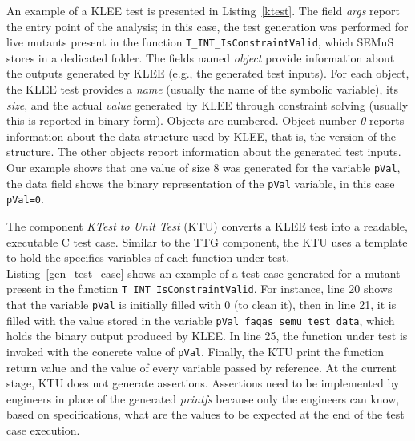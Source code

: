 An example of a KLEE test is presented in Listing~\ref{ktest}. The field \emph{args} report the entry point of the analysis; in this case, the test generation was performed for live mutants present in the function \texttt{T\_INT\_IsConstraintValid}, which SEMuS stores in a dedicated folder. The fields named \emph{object} provide information about the outputs generated by KLEE (e.g., the generated test inputs). 
For each object, the KLEE test provides a \emph{name} (usually the name of the symbolic variable), its \emph{size}, and the actual \emph{value} generated by KLEE through constraint solving (usually this is reported in binary form).
Objects are numbered. Object number \emph{0} reports information about the data structure used by KLEE, that is, the version of the structure. The other objects report information about the generated test inputs.
Our example shows that one value of size 8 was generated for the variable \texttt{pVal}, the data field shows the binary representation of the \texttt{pVal} variable, in this case \texttt{pVal=0}.





The component \emph{KTest to Unit Test} (KTU)  converts a KLEE test into a readable, executable C test case. Similar to the TTG component, the KTU uses a template to hold the specifics variables of each function under test. 
Listing~\ref{gen_test_case} shows an example of a test case generated for a mutant present in the function \texttt{T\_INT\_IsConstraintValid}. For instance, line 20 shows that the variable \texttt{pVal} is initially filled with 0 (to clean it), then in line 21, it is filled with the value stored in the variable \texttt{pVal\_faqas\_semu\_test\_data}, which holds the binary output produced by KLEE. In line 25, the function under test is invoked with the concrete value of \texttt{pVal}. Finally, the KTU print the function return value and the value of every variable passed by reference.
At the current stage, KTU does not generate assertions. Assertions need to be implemented by engineers in place of the generated \emph{printfs} because only the engineers can know, based on specifications, what are the values to be expected at the end of the test case execution.


\ENDCHANGEDWPT
